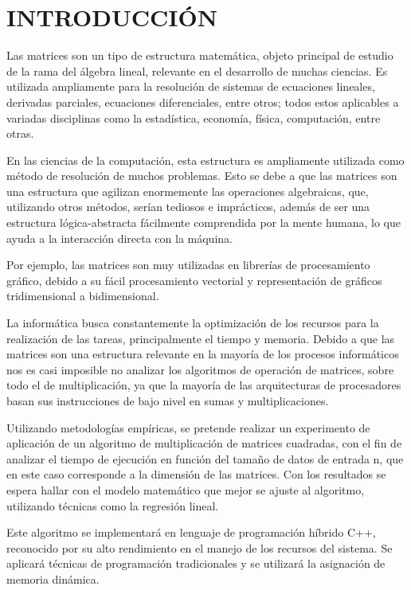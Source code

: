 \documentclass[11pt, twocolumn]{llncs}
\begin{document}
\section{INTRODUCCIÓN}
Las matrices son un tipo de estructura matemática, objeto principal de estudio de la rama del álgebra lineal, relevante en el desarrollo de muchas ciencias. Es utilizada ampliamente para la resolución de sistemas de ecuaciones lineales, derivadas parciales, ecuaciones diferenciales, entre otros; todos estos aplicables a variadas disciplinas como la estadística, economía, física, computación, entre otras.

En las ciencias de la computación, esta estructura es ampliamente utilizada como método de resolución de muchos problemas. Esto se debe a que las matrices son una estructura que agilizan enormemente las operaciones algebraicas, que, utilizando otros métodos, serían tediosos e imprácticos, además de ser una estructura lógica-abstracta fácilmente comprendida por la mente humana, lo que ayuda a la interacción directa con la máquina.

Por ejemplo, las matrices son muy utilizadas en librerías de procesamiento gráfico, debido a su fácil procesamiento vectorial y representación de gráficos tridimensional a bidimensional. 

La informática busca constantemente la optimización de los recursos para la realización de las tareas, principalmente el tiempo y memoria. Debido a que las matrices son una estructura relevante en la mayoría de los procesos informáticos nos es casi imposible no analizar los algoritmos de operación de matrices, sobre todo el de multiplicación, ya que la mayoría de las arquitecturas de procesadores basan sus instrucciones de bajo nivel en sumas y multiplicaciones. 

Utilizando metodologías empíricas, se pretende realizar un experimento de aplicación de un algoritmo de multiplicación de matrices cuadradas, con el fin de analizar el tiempo de ejecución en función del tamaño de datos de entrada n, que en este caso corresponde a la dimensión de las matrices. Con los resultados se espera hallar con el modelo matemático que mejor se ajuste al algoritmo, utilizando técnicas como la regresión lineal. 

Este algoritmo se implementará en lenguaje de programación híbrido C++, reconocido por su alto rendimiento en el manejo de los recursos del sistema. Se aplicará técnicas de programación tradicionales y se utilizará la asignación de memoria dinámica.
\end{document}
